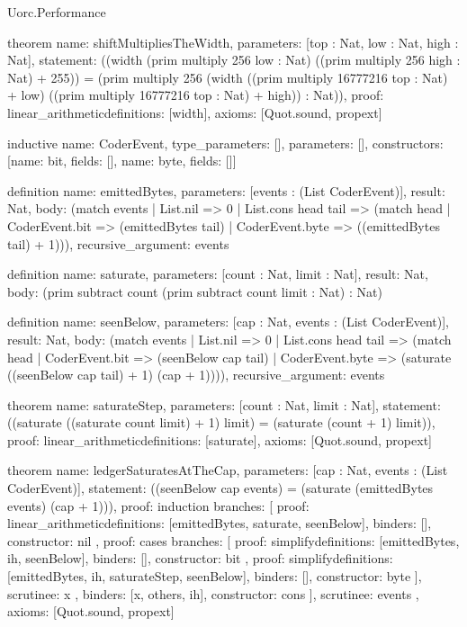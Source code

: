 \begin{lexlean}{Uorc.Performance}
\begin{semanticmodule}
theorem{
  name: shiftMultipliesTheWidth,
  parameters: [top : Nat, low : Nat, high : Nat],
  statement: ((width (prim multiply 256 low : Nat) ((prim multiply 256 high : Nat) + 255)) = (prim multiply 256 (width ((prim multiply 16777216 top : Nat) + low) ((prim multiply 16777216 top : Nat) + high)) : Nat)),
  proof: linear_arithmetic{definitions: [width]},
  axioms: [Quot.sound, propext]
}

inductive{
  name: CoderEvent,
  type_parameters: [],
  parameters: [],
  constructors: [{name: bit, fields: []}, {name: byte, fields: []}]
}

definition{
  name: emittedBytes,
  parameters: [events : (List CoderEvent)],
  result: Nat,
  body: (match events
    | List.nil => 0
    | List.cons head tail => (match head
      | CoderEvent.bit => (emittedBytes tail)
      | CoderEvent.byte => ((emittedBytes tail) + 1))),
  recursive_argument: events
}

definition{
  name: saturate,
  parameters: [count : Nat, limit : Nat],
  result: Nat,
  body: (prim subtract count (prim subtract count limit : Nat) : Nat)
}

definition{
  name: seenBelow,
  parameters: [cap : Nat, events : (List CoderEvent)],
  result: Nat,
  body: (match events
    | List.nil => 0
    | List.cons head tail => (match head
      | CoderEvent.bit => (seenBelow cap tail)
      | CoderEvent.byte => (saturate ((seenBelow cap tail) + 1) (cap + 1)))),
  recursive_argument: events
}

theorem{
  name: saturateStep,
  parameters: [count : Nat, limit : Nat],
  statement: ((saturate ((saturate count limit) + 1) limit) = (saturate (count + 1) limit)),
  proof: linear_arithmetic{definitions: [saturate]},
  axioms: [Quot.sound, propext]
}

theorem{
  name: ledgerSaturatesAtTheCap,
  parameters: [cap : Nat, events : (List CoderEvent)],
  statement: ((seenBelow cap events) = (saturate (emittedBytes events) (cap + 1))),
  proof: induction{
    branches: [
      {
        proof: linear_arithmetic{definitions: [emittedBytes, saturate, seenBelow]},
        binders: [],
        constructor: nil
      },
      {
        proof: cases{
          branches: [
            {
              proof: simplify{definitions: [emittedBytes, ih, seenBelow]},
              binders: [],
              constructor: bit
            },
            {
              proof: simplify{definitions: [emittedBytes, ih, saturateStep, seenBelow]},
              binders: [],
              constructor: byte
            }
          ],
          scrutinee: x
        },
        binders: [x, others, ih],
        constructor: cons
      }
    ],
    scrutinee: events
  },
  axioms: [Quot.sound, propext]
}


\end{semanticmodule}
\end{lexlean}
